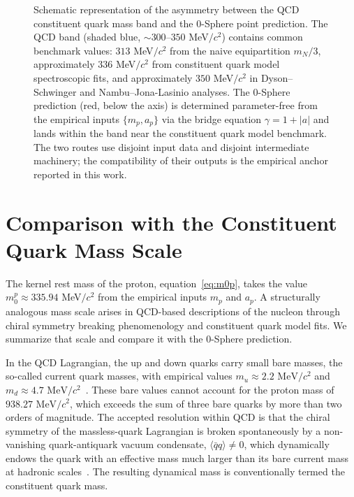 \documentclass[%
 reprint, amsmath,amssymb, aps, prc, ]{revtex4-2}
\numberwithin{equation}{section}
\begin{document}
\begin{figure}[t!]
\label{fig:band_vs_point}
\vspace{0.4em}
\begin{minipage}{0.95\textwidth}
\justifying\small
Schematic representation of the asymmetry between the QCD constituent quark mass band and the 0-Sphere point prediction. The QCD band (shaded blue, $\sim 300\text{--}350$ MeV$/c^2$) contains common benchmark values: $313$ MeV$/c^2$ from the naive equipartition $m_N/3$, approximately $336$ MeV$/c^2$ from constituent quark model spectroscopic fits, and approximately $350$ MeV$/c^2$ in Dyson--Schwinger and Nambu--Jona-Lasinio analyses. The 0-Sphere prediction (red, below the axis) is determined parameter-free from the empirical inputs $\{m_p, a_p\}$ via the bridge equation $\gamma = 1 + |a|$ and lands within the band near the constituent quark model benchmark. The two routes use disjoint input data and disjoint intermediate machinery; the compatibility of their outputs is the empirical anchor reported in this work.
\end{minipage}
\end{figure}

\section{Comparison with the Constituent Quark Mass Scale}
\label{sec:qcd}

The kernel rest mass of the proton, equation~\eqref{eq:m0p}, takes the value $m_0^p \approx 335.94$ MeV$/c^2$ from the empirical inputs $m_p$ and $a_p$.
A structurally analogous mass scale arises in QCD-based descriptions of the nucleon through chiral symmetry breaking phenomenology and constituent quark model fits.
We summarize that scale and compare it with the 0-Sphere prediction.

In the QCD Lagrangian, the up and down quarks carry small bare masses, the so-called current quark masses, with empirical values $m_u \approx 2.2 \text{ MeV}/c^2$ and $m_d \approx 4.7 \text{ MeV}/c^2$~\cite{PDG}.
These bare values cannot account for the proton mass of $938.27 \text{ MeV}/c^2$, which exceeds the sum of three bare quarks by more than two orders of magnitude.
The accepted resolution within QCD is that the chiral symmetry of the massless-quark Lagrangian is broken spontaneously by a non-vanishing quark-antiquark vacuum condensate, $\langle \bar{q} q \rangle \neq 0$, which dynamically endows the quark with an effective mass much larger than its bare current mass at hadronic scales~\cite{HalzenMartin,Griffiths}.
The resulting dynamical mass is conventionally termed the constituent quark mass.
\end{document}
